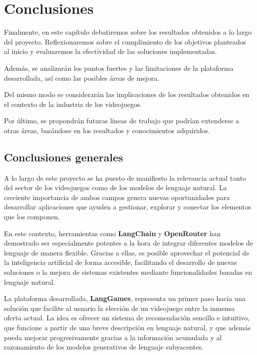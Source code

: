 \chapter{Conclusiones}

Finalmente, en este capítulo debatiremos sobre los resultados obtenidos a lo largo del proyecto. Reflexionaremos sobre el cumplimiento de los objetivos planteados al inicio y evaluaremos la efectividad de las soluciones implementadas. 

Además, se analizarán los puntos fuertes y las limitaciones de la plataforma desarrollada, así como las posibles áreas de mejora. 


Del mismo modo se considerarán las implicaciones de los resultados obtenidos en el contexto de la industria de los videojuegos. 


Por último, se propondrán futuras líneas de trabajo que podrían extenderse a otras áreas, basándose en los resultados y conocimientos adquiridos.  

\newpage

\section{Conclusiones generales}

A lo largo de este proyecto se ha puesto de manifiesto la relevancia actual tanto del sector de los videojuegos como de los modelos de lenguaje natural. La creciente importancia de ambos campos genera nuevas oportunidades para desarrollar aplicaciones que ayuden a gestionar, explorar y conectar los elementos que los componen.

En este contexto, herramientas como \textbf{LangChain} y \textbf{OpenRouter} han demostrado ser especialmente potentes a la hora de integrar diferentes modelos de lenguaje de manera flexible. Gracias a ellas, es posible aprovechar el potencial de la inteligencia artificial de forma accesible, facilitando el desarrollo de nuevas soluciones o la mejora de sistemas existentes mediante funcionalidades basadas en lenguaje natural.

La plataforma desarrollada, \textbf{LangGames}, representa un primer paso hacia una solución que facilite al usuario la elección de un videojuego entre la inmensa oferta actual. La idea es ofrecer un sistema de recomendación sencillo e intuitivo, que funcione a partir de una breve descripción en lenguaje natural, y que además pueda mejorar progresivamente gracias a la información acumulada y al razonamiento de los modelos generativos de lenguaje subyacentes.

